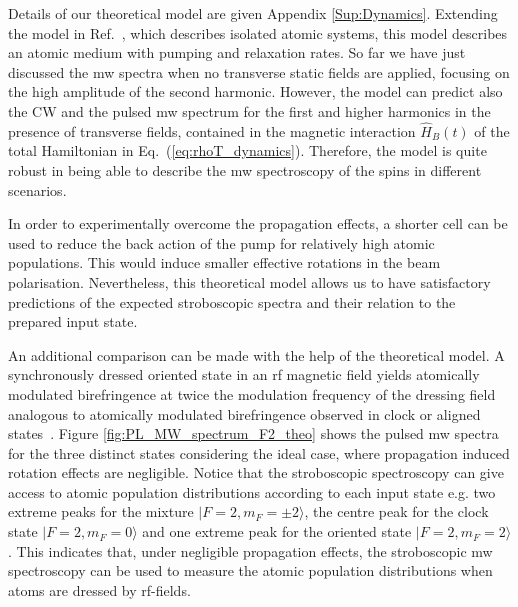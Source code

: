 \documentclass[%
reprint,
 amsmath,amssymb,
 aps,
floatfix,
]{revtex4-1}
\newcommand{\HM}[2][blue]{\textcolor{#1}{ #2}}
\newcommand{\TP}[2][red]{\textcolor{#1}{\textit{TP: #2}}}
\begin{document}
Details of our theoretical model are given Appendix \ref{Sup:Dynamics}. Extending the model in Ref.~\cite{sinuco19}, which describes isolated atomic systems, this model describes an atomic medium with pumping and relaxation rates. So far we have just discussed the mw spectra when no transverse static fields are applied, focusing on the high amplitude of the second harmonic. However, the model can predict also the CW and the pulsed mw spectrum for the first and higher harmonics in the presence of transverse fields, contained in the magnetic interaction $\hat{H}_B(t)$ of the total Hamiltonian in Eq.~(\ref{eq:rhoT_dynamics}). Therefore, the model is quite robust in being able to describe the mw spectroscopy of the spins in different scenarios.

In order to experimentally overcome the propagation effects, a shorter cell can be used to reduce the back action of the pump for relatively high atomic populations. This would induce smaller effective rotations in the beam polarisation. Nevertheless, this theoretical model allows us to have satisfactory predictions of the expected stroboscopic spectra and their relation to the prepared input state. 





An additional comparison can be made with the help of the theoretical model. A synchronously dressed oriented state in an rf magnetic field yields atomically modulated birefringence at twice the modulation frequency of the dressing field analogous to atomically modulated birefringence observed in clock or aligned states~\cite{Floquet21}. Figure \ref{fig:PL_MW_spectrum_F2_theo} shows the pulsed mw spectra for the three distinct states considering the ideal case, where propagation induced rotation effects are negligible. 
Notice that the stroboscopic spectroscopy can give access to atomic population distributions according to each input state e.g. two extreme peaks for the mixture $|F=2, m_F=\pm2\rangle$, the centre peak for the clock state $|F=2, m_F=0\rangle$ and one extreme peak for the oriented state $|F=2, m_F=2\rangle$. This indicates that, under negligible propagation effects, the stroboscopic mw spectroscopy can be used to measure the atomic population distributions when atoms are dressed by rf-fields.
 
\end{document}
